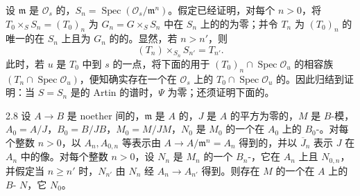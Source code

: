 设 $\mathfrak m$ 是 $\mathcal O_s$ 的，$S_n=\operatorname{Spec}(\mathcal O_s/\mathfrak m^n)$。假定已经证明，对每个 $n>0$，将 $T_0\times_S S_n=(T_0)_n$ 为 $G_n=G\times_S S_n$ 中在 $S_n$ 上的的为零；并令 $T_n$ 为 $(T_0)_n$ 的唯一的在 $S_n$ 上且为 $G_n$ 的的。显然，若 $n>n'$，则
\[(T_n)\times_{S_n}S_{n'}=T_{n'}.\]
此时，若 $u$ 是 $T_0$ 中到 $s$ 的一点，将下面的用于 $(T_0)_n\cap\operatorname{Spec}\mathcal O_u$ 的相容族 $(T_n\cap\operatorname{Spec}\mathcal O_u)$，便知确实存在一个在 $\mathcal O_s$ 上的 $T_0\cap\operatorname{Spec}\mathcal O_u$ 的。因此归结到证明：当 $S=S_n$ 是的 Artin 的谱时，$\Psi$ 为零；还须证明下面的。
\begin{SGAresult}{}{2.8}
设 $A\to B$ 是 noether 间的，$\mathfrak m$ 是 $A$ 的，$J$ 是 $A$ 的平方为零的，$M$ 是 $B$-模，$A_0=A/J$，$B_0=B/JB$，$M_0=M/JM$，$N_0$ 是 $M_0$ 的一个在 $A_0$ 上的 $B_0$-。对每个整数 $n>0$，以 $A_n,A_{0,n}$ 等表示由 $A\to A/\mathfrak m^n=A_n$ 得到的，并以 $\overline J_n$ 表示 $J$ 在 $A_n$ 中的像。对每个整数 $n>0$，设 $N_n$ 是 $M_n$ 的一个 $B_n$-，它在 $A_n$ 上且 $N_{0,n}$，并假定当 $n\ge n'$ 时，$N_{n'}$ 由 $N_n$ 经 $A_n\to A_{n'}$ 得到。则存在 $M$ 的一个在 $A$ 上的 $B$- $N$，它 $N_0$。
\end{SGAresult}

